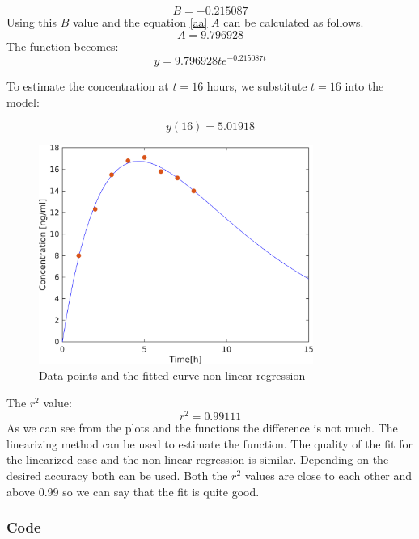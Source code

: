 \documentclass[12pt, a4paper]{article}
\numberwithin{equation}{section}
\begin{document}
\begin{equation}
    B = -0.215087
\end{equation}
Using this $B$ value and the equation \ref{aa} $A$ can be calculated as follows.
\begin{equation}
    A = 9.796928
\end{equation}
The function becomes:
\begin{equation}
    y = 9.796928te^{-0.215087t}
\end{equation}

To estimate the concentration at $t = 16$ hours, we substitute $t = 16$ into the model:

\begin{equation}
    y(16) = 5.01918
\end{equation}

\begin{figure}[H]
  \centering
  \includegraphics[width=0.8\textwidth]{img/Q2plot2.png}
  \captionsetup{justification=centering}
  \caption{Data points and the fitted curve non linear regression}
\end{figure}
The $r^2$ value:
$$ r^2 = 0.99111$$
As we can see from the plots and the functions the difference is not much. The linearizing method can be used to estimate the function. The quality of the fit for the linearized case and the non linear regression is similar. Depending on the desired accuracy both can be used. Both the $r^2$ values are close to each other and above 0.99 so we can say that the fit is quite good.

\subsubsection{Code}

\end{document}
